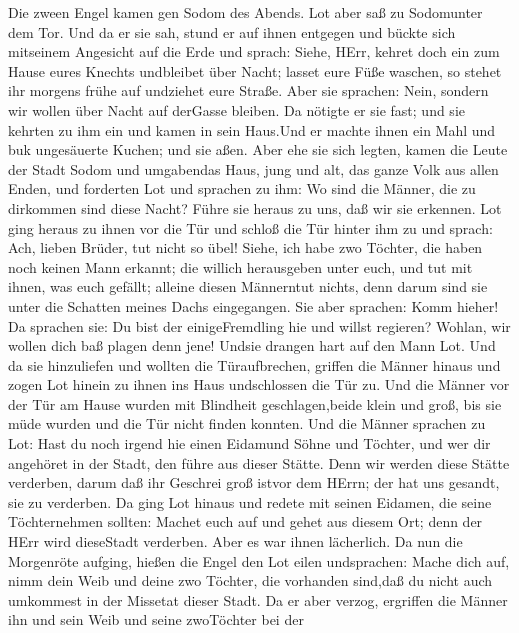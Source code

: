  Die zween Engel kamen gen Sodom des Abends. Lot aber saß zu
Sodomunter dem Tor. Und da er sie sah, stund er auf ihnen entgegen und
bückte sich mitseinem Angesicht auf die Erde  und sprach:
Siehe, HErr, kehret doch ein zum Hause eures Knechts undbleibet über
Nacht; lasset eure Füße waschen, so stehet ihr morgens frühe auf
undziehet eure Straße. Aber sie sprachen: Nein, sondern wir wollen über
Nacht auf derGasse bleiben.  Da nötigte er sie fast; und sie
kehrten zu ihm ein und kamen in sein Haus.Und er machte ihnen ein Mahl
und buk ungesäuerte Kuchen; und sie aßen.  Aber ehe sie sich
legten, kamen die Leute der Stadt Sodom und umgabendas Haus, jung und
alt, das ganze Volk aus allen Enden,  und forderten Lot und
sprachen zu ihm: Wo sind die Männer, die zu dirkommen sind diese Nacht?
Führe sie heraus zu uns, daß wir sie erkennen.  Lot ging
heraus zu ihnen vor die Tür und schloß die Tür hinter ihm zu
 und sprach: Ach, lieben Brüder, tut nicht so übel!
 Siehe, ich habe zwo Töchter, die haben noch keinen Mann
erkannt; die willich herausgeben unter euch, und tut mit ihnen, was euch
gefällt; alleine diesen Männerntut nichts, denn darum sind sie unter die
Schatten meines Dachs eingegangen.  Sie aber sprachen: Komm
hieher! Da sprachen sie: Du bist der einigeFremdling hie und willst
regieren? Wohlan, wir wollen dich baß plagen denn jene! Undsie drangen
hart auf den Mann Lot. Und da sie hinzuliefen und wollten die
Türaufbrechen,  griffen die Männer hinaus und zogen Lot
hinein zu ihnen ins Haus undschlossen die Tür zu.  Und die
Männer vor der Tür am Hause wurden mit Blindheit geschlagen,beide klein
und groß, bis sie müde wurden und die Tür nicht finden konnten.
 Und die Männer sprachen zu Lot: Hast du noch irgend hie
einen Eidamund Söhne und Töchter, und wer dir angehöret in der Stadt,
den führe aus dieser Stätte.  Denn wir werden diese Stätte
verderben, darum daß ihr Geschrei groß istvor dem HErrn; der hat uns
gesandt, sie zu verderben.  Da ging Lot hinaus und redete
mit seinen Eidamen, die seine Töchternehmen sollten: Machet euch auf und
gehet aus diesem Ort; denn der HErr wird dieseStadt verderben. Aber es
war ihnen lächerlich.  Da nun die Morgenröte aufging,
hießen die Engel den Lot eilen undsprachen: Mache dich auf, nimm dein
Weib und deine zwo Töchter, die vorhanden sind,daß du nicht auch
umkommest in der Missetat dieser Stadt.  Da er aber verzog,
ergriffen die Männer ihn und sein Weib und seine zwoTöchter bei der
